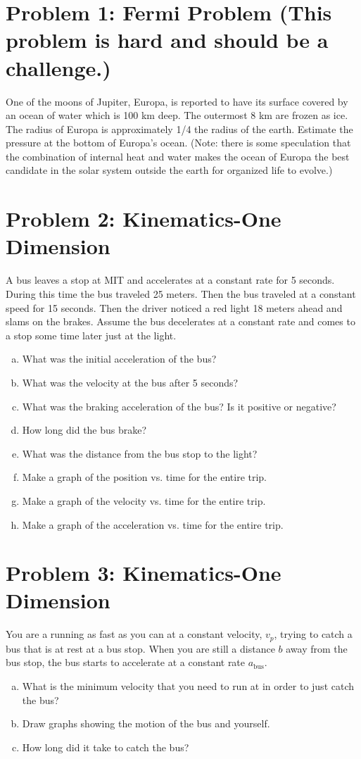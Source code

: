 \documentclass[problems]{esg8012pset}
\date{September 8}
\begin{document}
\section*{Problem 1: Fermi Problem (This problem is hard and should be a challenge.)}
  One of the moons of Jupiter, Europa, is reported to have its surface covered by an ocean of water
  which is 100 km deep.  The outermost 8 km are frozen as ice. The radius of Europa is
  approximately 1/4 the radius of the earth. Estimate the pressure at the bottom of Europa's ocean.
  (Note: there is some speculation that the combination of internal heat and water makes the ocean
  of Europa the best candidate in the solar system outside the earth for organized life to evolve.)
\section*{Problem 2: Kinematics-One Dimension}
  A bus leaves a stop at MIT and accelerates at a constant rate for 5 seconds. During this time the
  bus traveled 25 meters. Then the bus traveled at a constant speed for 15 seconds. Then the driver
  noticed a red light 18 meters ahead and slams on the brakes. Assume the bus decelerates at a
  constant rate and comes to a stop some time later just at the light.
  \begin{enumerate}[a)]
    \item What was the initial acceleration of the bus?
    \item What was the velocity at the bus after 5 seconds?
    \item What was the braking acceleration of the bus? Is it positive or negative?
    \item How long did the bus brake?
    \item What was the distance from the bus stop to the light?
    \item Make a graph of the position vs. time for the entire trip.
    \item Make a graph of the velocity vs. time for the entire trip.
    \item Make a graph of the acceleration vs. time for the entire trip.
  \end{enumerate}
\section*{Problem 3: Kinematics-One Dimension}
  You are a running as fast as you can at a constant velocity, $v_p$, trying to catch a bus that is at rest
  at a bus stop. When you are still a distance $b$ away from the bus stop, the bus starts to accelerate
  at a constant rate $a_\text{bus}$.
  \begin{enumerate}[a)]
    \item What is the minimum velocity that you need to run at in order to just catch the bus?
    \item Draw graphs showing the motion of the bus and yourself.
    \item How long did it take to catch the bus?
  \end{enumerate}
\end{document}
